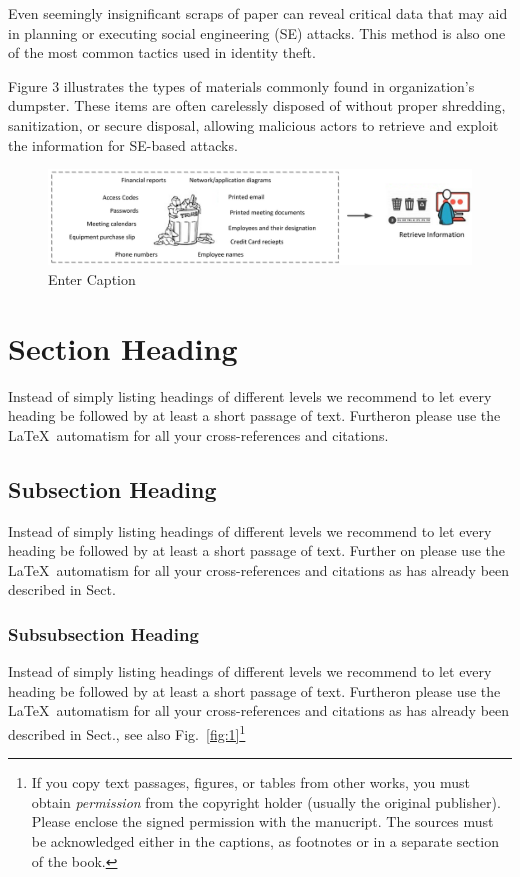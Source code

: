 Even seemingly insignificant scraps of paper can reveal critical data that may aid in planning or executing social engineering (SE) attacks. This method is also one of the most common tactics used in identity theft.

Figure 3 illustrates the types of materials commonly found in organization's dumpster. These items are often carelessly disposed of without proper shredding, sanitization, or secure disposal, allowing malicious actors to retrieve and exploit the information for SE-based attacks.

\begin{figure}
    \centering
    \includegraphics[width=0.75\linewidth]{dumpsterdive.png}
    \caption{Enter Caption}
    \label{fig:placeholder}
\end{figure}

















\section{Section Heading}
Instead of simply listing headings of different levels we recommend to let every heading be followed by at least a short passage of text. Furtheron please use the \LaTeX\ automatism for all your cross-references and citations.


\subsection{Subsection Heading}

Instead of simply listing headings of different levels we recommend to let every heading be followed by at least a short passage of text. Further on please use the \LaTeX\ automatism for all your cross-references and citations as has already been described in Sect.~
\subsubsection{Subsubsection Heading}
Instead of simply listing headings of different levels we recommend to let every heading be followed by at least a short passage of text. Furtheron please use the \LaTeX\ automatism for all your cross-references and citations as has already been described in Sect., see also Fig.~\ref{fig:1}\footnote{If you copy text passages, figures, or tables from other works, you must obtain \textit{permission} from the copyright holder (usually the original publisher). Please enclose the signed permission with the manucript. The sources must be acknowledged either in the captions, as footnotes or in a separate section of the book.}

